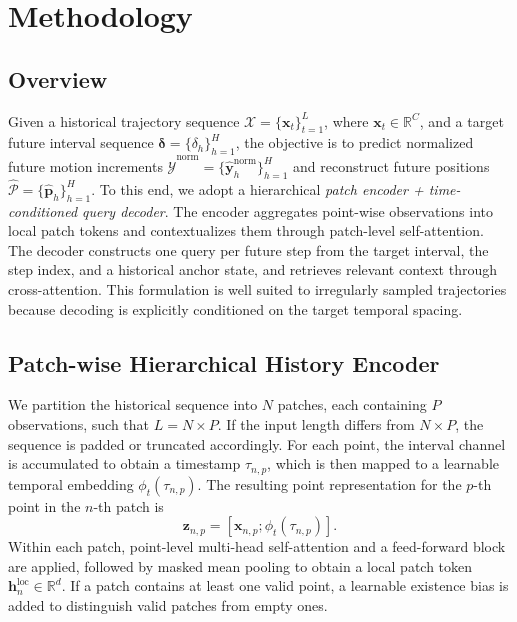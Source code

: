 
\section{Methodology}
\label{sec:method}

\subsection{Overview}
\label{subsec:overview}

Given a historical trajectory sequence $\mathcal{X}=\{\bm{x}_t\}_{t=1}^{L}$, where $\bm{x}_t \in \mathbb{R}^{C}$, and a target future interval sequence $\bm{\delta}=\{\delta_h\}_{h=1}^{H}$, the objective is to predict normalized future motion increments $\hat{\mathcal{Y}}^{\mathrm{norm}}=\{\hat{\bm{y}}_h^{\mathrm{norm}}\}_{h=1}^{H}$ and reconstruct future positions $\hat{\mathcal{P}}=\{\hat{\bm{p}}_h\}_{h=1}^{H}$. To this end, we adopt a hierarchical \emph{patch encoder + time-conditioned query decoder}. The encoder aggregates point-wise observations into local patch tokens and contextualizes them through patch-level self-attention. The decoder constructs one query per future step from the target interval, the step index, and a historical anchor state, and retrieves relevant context through cross-attention. This formulation is well suited to irregularly sampled trajectories because decoding is explicitly conditioned on the target temporal spacing.

\subsection{Patch-wise Hierarchical History Encoder}
\label{subsec:encoder}

We partition the historical sequence into $N$ patches, each containing $P$ observations, such that $L=N\times P$. If the input length differs from $N\times P$, the sequence is padded or truncated accordingly. For each point, the interval channel is accumulated to obtain a timestamp $\tau_{n,p}$, which is then mapped to a learnable temporal embedding $\phi_t(\tau_{n,p})$. The resulting point representation for the $p$-th point in the $n$-th patch is
\begin{equation}
\bm{z}_{n,p} = [\bm{x}_{n,p}; \phi_t(\tau_{n,p})].
\end{equation}
Within each patch, point-level multi-head self-attention and a feed-forward block are applied, followed by masked mean pooling to obtain a local patch token $\bm{h}_n^{\mathrm{loc}} \in \mathbb{R}^{d}$. If a patch contains at least one valid point, a learnable existence bias is added to distinguish valid patches from empty ones.

